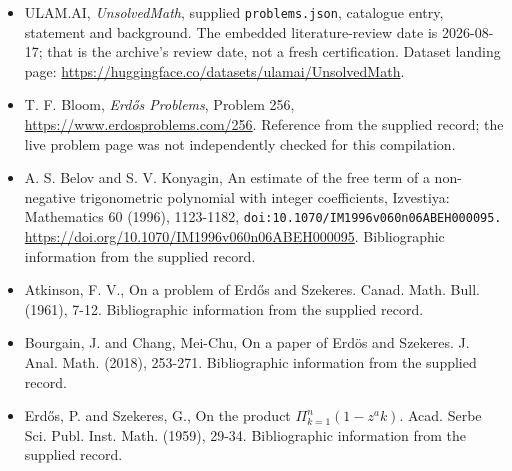 \documentclass[11pt,a4paper]{article}
\begin{document}
{\small

\begin{itemize}

\item[\hypertarget{source:statement:1}{S1}] ULAM.AI, \emph{UnsolvedMath}, supplied \texttt{problems.json}, catalogue entry, statement and background. The embedded literature-review date is 2026-08-17; that is the archive’s review date, not a fresh certification. Dataset landing page: \url{https://huggingface.co/datasets/ulamai/UnsolvedMath}.

\item[\hypertarget{source:statement:2}{S2}] T. F. Bloom, \emph{Erdős Problems}, Problem 256, \url{https://www.erdosproblems.com/256}. Reference from the supplied record; the live problem page was not independently checked for this compilation.

\item[\hypertarget{source:statement:3}{S3}] A. S. Belov and S. V. Konyagin, An estimate of the free term of a non-negative trigonometric polynomial with integer coefficients, Izvestiya: Mathematics 60 (1996), 1123-1182, \nolinkurl{doi:10.1070/IM1996v060n06ABEH000095.} \url{https://doi.org/10.1070/IM1996v060n06ABEH000095}. Bibliographic information from the supplied record.

\item[\hypertarget{source:statement:4}{S4}] Atkinson, F. V., On a problem of Erd\H{o}s and Szekeres. Canad. Math. Bull. (1961), 7-12. Bibliographic information from the supplied record.

\item[\hypertarget{source:statement:5}{S5}] Bourgain, J. and Chang, Mei-Chu, On a paper of Erd\"{o}s and Szekeres. J. Anal. Math. (2018), 253-271. Bibliographic information from the supplied record.

\item[\hypertarget{source:statement:6}{S6}] Erd\H{o}s, P. and Szekeres, G., On the product $\Pi^n_{k=1}(1-z^ak)$. Acad. Serbe Sci. Publ. Inst. Math. (1959), 29-34. Bibliographic information from the supplied record.

\end{itemize}

}

\label{end:statement}
\end{document}
